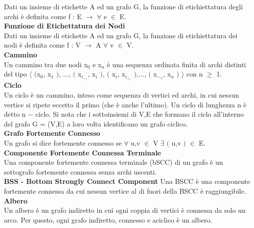 \documentclass{article}
\begin{document}
Dati un insieme di etichette A ed un grafo G, la funzione di etichiettatura degli archi è definita come f : E $\rightarrow$ $\forall$ e $\in$ E.
\\
\textbf{Funzione di Etichettatura dei Nodi}
\\
Dati un insieme di etichette A ed un grafo G, la funzione di etichiettatura dei nodi è definita come f : V $\rightarrow$ A $\forall$ v $\in$ V.
\\
\textbf{Cammino}
\\
Un cammino tra due nodi x$_0$ e x$_n$ è una sequenza ordinata finita di archi distinti del tipo $\bigl\langle$ $\big($x$_0$, x$_1$ $\big)$, ..., $\big($ x$_i_-_1$, x$_i$ $\big)$, $\big($ x$_i$, x$_i_+_1$ $\big)$,..., $\big($ x$_-_1$, x$_n$ $\big)$ $\bigr\rangle$ con n $\geq$ 1.
\\
\textbf{Ciclo}
\\
Un ciclo è un cammino, inteso come sequenza di vertici ed archi, in cui nessun vertice si ripete eccetto il primo (che è anche l’ultimo). Un ciclo di lunghezza n è detto n − ciclo.
Si nota che i sottoinsiemi di V,E che formano il ciclo all’interno del grafo G = (V,E) a loro volta identificano un grafo ciclico.
\\
\textbf{Grafo Fortemente Connesso}
\\
Un grafo si dice fortemente connesso se $\forall$ u,v $\in$ V $\exists$ $\big($ u,v $\big)$ $\in$ E.
\\
\textbf{Componente Fortemente Connessa Terminale}
\\
Una componente fortemente connessa terminale (bSCC) di un grafo è un sottografo fortemente connessa senza archi uscenti.
\\
\textbf{BSS - Bottom Strongly Connect Component}
Una BSCC è una componente fortemente connessa da cui nessun vertice al di fuori della BSCC è raggiungibile.
\\
\textbf{Albero}
\\
Un albero è un grafo indiretto in cui ogni coppia di vertici è connessa da solo un arco. Per questo, ogni grafo indiretto, connesso e aciclico è un albero.
\\
\end{document}
